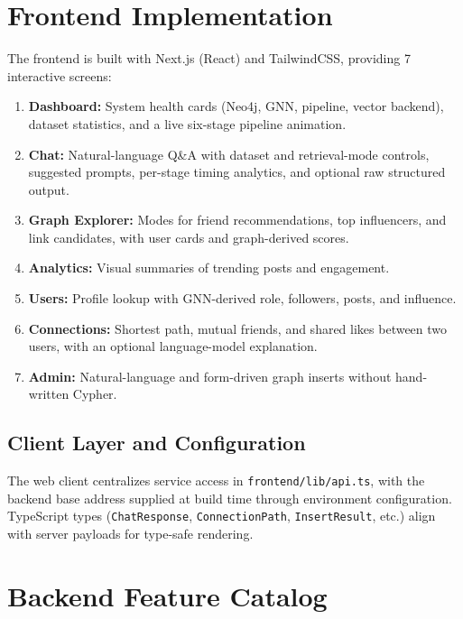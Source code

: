 \documentclass[conference]{IEEEtran}
\begin{document}
\section{Frontend Implementation}

The frontend is built with Next.js (React) and TailwindCSS, providing 7 interactive screens:

\begin{enumerate}
  \item \textbf{Dashboard:} System health cards (Neo4j, GNN, pipeline, vector backend), dataset statistics, and a live six-stage pipeline animation.
  \item \textbf{Chat:} Natural-language Q\&A with dataset and retrieval-mode controls, suggested prompts, per-stage timing analytics, and optional raw structured output.
  \item \textbf{Graph Explorer:} Modes for friend recommendations, top influencers, and link candidates, with user cards and graph-derived scores.
  \item \textbf{Analytics:} Visual summaries of trending posts and engagement.
  \item \textbf{Users:} Profile lookup with GNN-derived role, followers, posts, and influence.
  \item \textbf{Connections:} Shortest path, mutual friends, and shared likes between two users, with an optional language-model explanation.
  \item \textbf{Admin:} Natural-language and form-driven graph inserts without hand-written Cypher.
\end{enumerate}

\subsection{Client Layer and Configuration}
The web client centralizes service access in \texttt{frontend/lib/api.ts}, with the backend base address supplied at build time through environment configuration. TypeScript types (\texttt{ChatResponse}, \texttt{ConnectionPath}, \texttt{InsertResult}, etc.) align with server payloads for type-safe rendering.

\section{Backend Feature Catalog}
\end{document}
